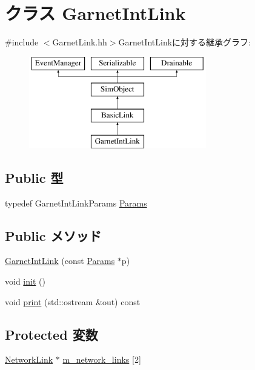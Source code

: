 \hypertarget{classGarnetIntLink}{
\section{クラス GarnetIntLink}
\label{classGarnetIntLink}
}


{\ttfamily \#include $<$GarnetLink.hh$>$}GarnetIntLinkに対する継承グラフ:\begin{figure}[H]
\begin{center}
\leavevmode
\includegraphics[height=4cm]{classGarnetIntLink}
\end{center}
\end{figure}
\subsection*{Public 型}
\begin{DoxyCompactItemize}
\item 
typedef GarnetIntLinkParams \hyperlink{classGarnetIntLink_ac67f1fad0686704820c88642f65ddcce}{Params}
\end{DoxyCompactItemize}
\subsection*{Public メソッド}
\begin{DoxyCompactItemize}
\item 
\hyperlink{classGarnetIntLink_a3c3260a4e57f63aceb4cfbe087f1fcda}{GarnetIntLink} (const \hyperlink{classGarnetIntLink_ac67f1fad0686704820c88642f65ddcce}{Params} $\ast$p)
\item 
void \hyperlink{classGarnetIntLink_a02fd73d861ef2e4aabb38c0c9ff82947}{init} ()
\item 
void \hyperlink{classGarnetIntLink_ac55fe386a101fbae38c716067c9966a0}{print} (std::ostream \&out) const 
\end{DoxyCompactItemize}
\subsection*{Protected 変数}
\begin{DoxyCompactItemize}
\item 
\hyperlink{classNetworkLink}{NetworkLink} $\ast$ \hyperlink{classGarnetIntLink_a94c05b942b28036b0b5ae2a8c639f068}{m\_\-network\_\-links} \mbox{[}2\mbox{]}
\end{DoxyCompactItemize}
